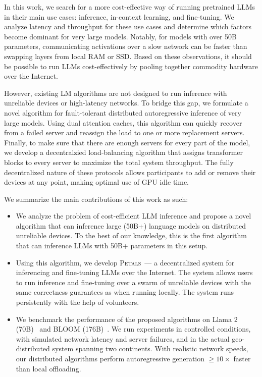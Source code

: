 In this work, we search for a more cost-effective way of running pretrained LLMs in their main use cases: inference, in-context learning, and fine-tuning. We analyze latency and throughput for these use cases and determine which factors become dominant for very large models. Notably, for models with over 50B parameters, communicating activations over a slow network can be faster than swapping layers from local RAM or SSD. Based on these observations, it should be possible to run LLMs cost-effectively by pooling together commodity hardware over the Internet.


However, existing LM algorithms are not designed to run inference with unreliable devices or high-latency networks. To bridge this gap, we formulate a novel algorithm for fault-tolerant distributed autoregressive inference of very large models. Using dual attention caches, this algorithm can quickly recover from a failed server and reassign the load to one or more replacement servers. Finally, to make sure that there are enough servers for every part of the model, we develop a decentralzied load-balancing algorithm that assigns transformer blocks to every server to maximize the total system throughput. The fully decentralized nature of these protocols allows participants to add or remove their devices at any point, making optimal use of GPU idle time.

We summarize the main contributions of this work as such:
\begin{itemize}
    \item We analyze the problem of cost-efficient LLM inference and propose a novel algorithm that can inference large (50B+) language models on distributed unreliable devices. To the best of our knowledge, this is the first algorithm that can inference LLMs with 50B+ parameters in this setup.
    \item Using this algorithm, we develop \textsc{Petals}~--- a decentralized system for inferencing and fine-tuning LLMs over the Internet. The system allows users to run inference and fine-tuning over a swarm of unreliable devices with the same correctness guarantees as when running locally. The system runs persistently with the help of volunteers.
    \item We benchmark the performance of the proposed algorithms on Llama 2 (70B)~\citep{llama2} and BLOOM (176B)~\citep{bloom}. We run experiments in controlled conditions, with simulated network latency and server failures, and in the actual geo-distributed system spanning two continents. With realistic network speeds, our distributed algorithms perform autoregressive generation ${\geq}10\times$ faster than local offloading.
\end{itemize}


